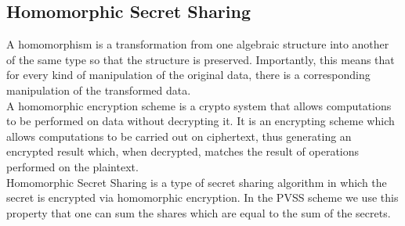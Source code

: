 \subsection{Homomorphic Secret Sharing}
A homomorphism is a transformation from one algebraic structure into another of the same type so that the structure is preserved. Importantly, this means that for every kind of manipulation of the original data, there is a corresponding manipulation of the transformed data.\\

\noindent 
A homomorphic encryption scheme is a crypto system that allows computations to be performed on data without decrypting it. It is an encrypting scheme which allows computations to be carried out on ciphertext, thus generating an encrypted result which, when decrypted, matches the result of operations performed on the plaintext.\\

\noindent 
Homomorphic Secret Sharing is a type of secret sharing algorithm in which the secret is encrypted via homomorphic encryption. In the PVSS scheme we use this property that one can sum the shares which are equal to the sum of the secrets.

